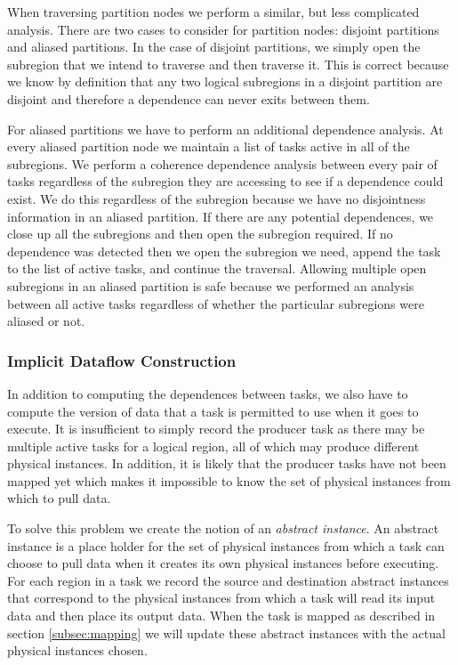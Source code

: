 When traversing partition nodes we perform a similar, but less complicated analysis.  There
are two cases to consider for partition nodes: disjoint partitions and aliased partitions.
In the case of disjoint partitions, we simply open the subregion that we intend to traverse
and then traverse it.  This is correct because we know by definition that any two logical
subregions in a disjoint partition are disjoint and therefore a dependence can never exits
between them.

For aliased partitions we have to perform an additional dependence analysis.  At every
aliased partition node we maintain a list of tasks active in all of the subregions.  We
perform a coherence dependence analysis between every pair of tasks regardless of the subregion
they are accessing to see if a dependence could exist.  We do this regardless of the subregion
because we have no disjointness information in an aliased partition.  If there are any
potential dependences, we close up all the subregions and then open the subregion required.  If
no dependence was detected then we open the subregion we need, append the task to the list
of active tasks, and continue the traversal.  Allowing multiple open subregions in an aliased
partition is safe because we performed an analysis between all active tasks regardless of
whether the particular subregions were aliased or not.

\subsubsection{Implicit Dataflow Construction}
\label{subsec:dataflow}
In addition to computing the dependences between tasks, we also have to compute the version
of data that a task is permitted to use when it goes to execute.
It is insufficient to simply record the producer task as there
may be multiple active tasks for a logical region, all of which may produce different physical
instances.  In addition, it is likely that the producer tasks have not been mapped
yet which makes it impossible to know the set of physical instances from which to pull data.

To solve this problem we create the notion of an {\em abstract instance}.  An abstract instance
is a place holder for the set of physical instances from which a task can choose to pull
data when it creates its own physical instances before executing.  For each region in
a task we record the source and destination abstract instances that correspond to the physical
instances from which a task will read its input data and then place its output data.
When the task is mapped as described in section \ref{subsec:mapping} we will update these
abstract instances with the actual physical instances chosen.

